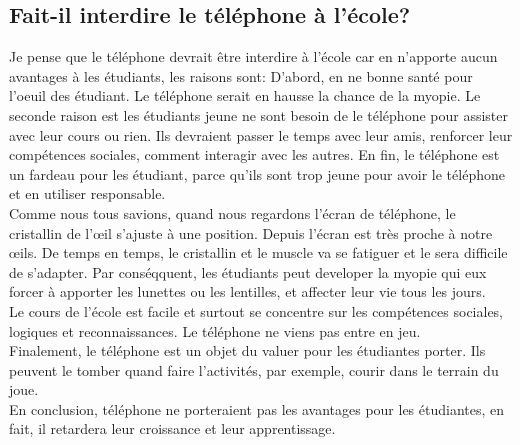 \documentclass{book}
\begin{document}
        \subsection{Fait-il interdire le téléphone à l'école?}
            Je pense que le téléphone devrait être interdire à l'école car en n'apporte aucun avantages à les étudiants,
            les raisons sont: D'abord, en ne bonne santé pour l'oeuil des étudiant. Le téléphone serait en hausse la chance de la myopie.
            Le seconde raison est les étudiants jeune ne sont besoin de le téléphone pour assister avec leur cours ou rien. Ils devraient passer le temps avec leur amis,
            renforcer leur compétences sociales, comment interagir avec les autres.
            En fin, le téléphone est un fardeau pour les étudiant, parce qu'ils sont trop jeune pour avoir le téléphone et en utiliser responsable. \\
            Comme nous tous savions, quand nous regardons l'écran de téléphone, le cristallin de l'œil s'ajuste à une position. Depuis l'écran est très proche à notre œils.
            De temps en temps, le cristallin et le muscle va se fatiguer et le sera difficile de s'adapter. Par conséqquent, les étudiants peut developer la myopie 
            qui eux forcer à apporter les lunettes ou les lentilles, et affecter leur vie tous les jours.\\
            Le cours de l'école est facile et surtout se concentre sur les compétences sociales, logiques et reconnaissances.
            Le téléphone ne viens pas entre en jeu. \\
            Finalement, le téléphone est un objet du valuer pour les étudiantes porter. Ils peuvent le tomber quand faire l'activités, par exemple, courir dans le terrain du joue. \\
            En conclusion, téléphone ne porteraient pas les avantages pour les étudiantes, en fait, il retardera leur croissance et leur apprentissage.
\end{document}
